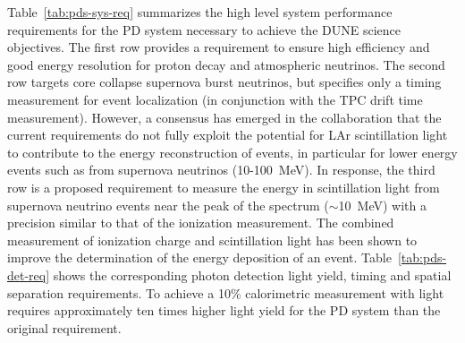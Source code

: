 Table~\ref{tab:pds-sys-req} summarizes the high level system performance requirements for the PD system necessary to achieve the DUNE science objectives. The first row provides a requirement to ensure high efficiency and good energy resolution for proton decay and atmospheric neutrinos.  The second row targets core collapse supernova burst neutrinos, but specifies only a timing measurement for event localization (in conjunction with the TPC drift time measurement). 
However, a consensus has emerged in the collaboration that the current requirements do not fully exploit the potential  for LAr scintillation light to contribute to the energy reconstruction of events, in particular for lower energy events such as from supernova neutrinos (\num{10}-\SI{100}{MeV}). In response, the third row is a proposed requirement to measure the energy in scintillation light from supernova neutrino events near the peak of the spectrum ($\sim$\SI{10}{MeV}) with a precision similar to that of the ionization measurement. The combined measurement of ionization charge and scintillation light has been shown to improve the determination of the energy deposition of an event. 
Table~\ref{tab:pds-det-req} shows the corresponding photon detection light yield, timing and spatial separation requirements. To achieve a 10\%  calorimetric measurement with light requires approximately ten times higher light yield for the PD system than the original requirement. 



